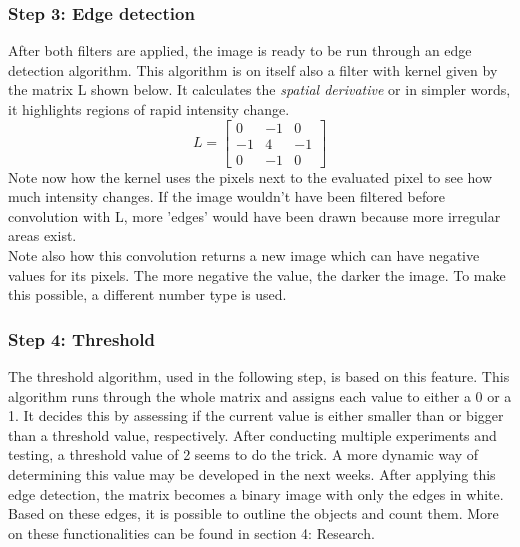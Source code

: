 \documentclass{article}
\begin{document}
\subsubsection{Step 3: Edge detection}
After both filters are applied, the image is ready to be run through an edge detection algorithm\cite{edge_detection}. This algorithm is on itself also a filter with kernel given by the matrix L shown below.
It calculates the \textit{spatial derivative} or in simpler words, it highlights regions of rapid intensity change.
\begin{equation}
L =\begin{bmatrix}
0&-1&0\\
-1&4&-1\\
0&-1&0
\end{bmatrix}
\end{equation}
\noindent Note now how the kernel uses the pixels next to the evaluated pixel to see how much intensity changes. If the image wouldn't have been filtered before convolution with L, more 'edges' would have been drawn because more irregular areas exist.\\
Note also how this convolution returns a new image which can have negative values for its pixels. The more negative the value, the darker the image. To make this possible, a different number type is used.
\subsubsection{Step 4: Threshold}
The threshold algorithm, used in the following step, is based on this feature. This algorithm runs through the whole matrix and assigns each value to either a 0 or a 1. It decides this by assessing if the current value is either smaller than or bigger than a threshold value, respectively. After conducting multiple experiments and testing, a threshold value of 2 seems to do the trick. A more dynamic way of determining this value may be developed in the next weeks. After applying this edge detection, the matrix becomes a binary image with only the edges in white. Based on these edges, it is possible to outline the objects and count them. More on these functionalities can be found  in section 4: Research. 
\end{document}
